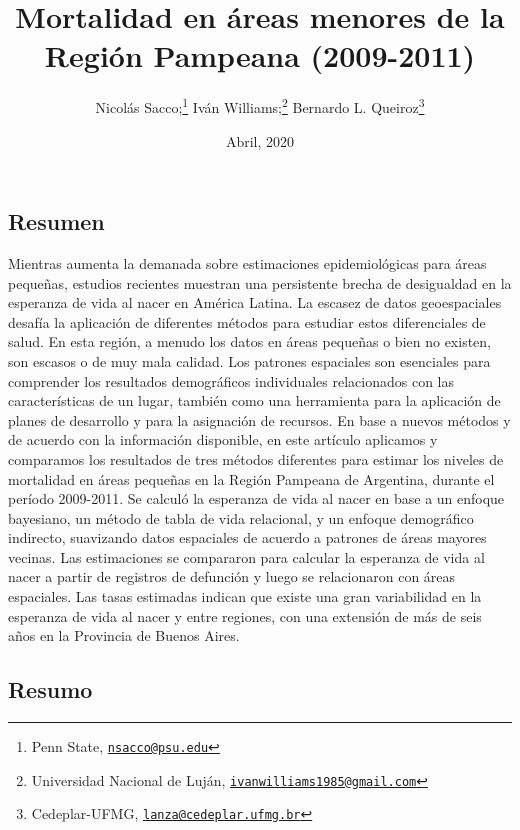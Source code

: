 \documentclass[12pt,]{article}
\title{Mortalidad en áreas menores de la Región Pampeana (2009-2011)}
\author{Nicolás Sacco;\footnote{Penn State,
  \href{mailto:nsacco@psu.edu}{\nolinkurl{nsacco@psu.edu}}} Iván
Williams;\footnote{Universidad Nacional de Luján,
  \href{mailto:ivanwilliams1985@gmail.com}{\nolinkurl{ivanwilliams1985@gmail.com}}}
Bernardo L. Queiroz\footnote{Cedeplar-UFMG,
  \href{mailto:lanza@cedeplar.ufmg.br}{\nolinkurl{lanza@cedeplar.ufmg.br}}}}
\date{Abril, 2020}
\begin{document}
\maketitle

\hypertarget{resumen}{%
\subsection{Resumen}\label{resumen}}

Mientras aumenta la demanada sobre estimaciones epidemiológicas para
áreas pequeñas, estudios recientes muestran una persistente brecha de
desigualdad en la esperanza de vida al nacer en América Latina. La
escasez de datos geoespaciales desafía la aplicación de diferentes
métodos para estudiar estos diferenciales de salud. En esta región, a
menudo los datos en áreas pequeñas o bien no existen, son escasos o de
muy mala calidad. Los patrones espaciales son esenciales para comprender
los resultados demográficos individuales relacionados con las
características de un lugar, también como una herramienta para la
aplicación de planes de desarrollo y para la asignación de recursos. En
base a nuevos métodos y de acuerdo con la información disponible, en
este artículo aplicamos y comparamos los resultados de tres métodos
diferentes para estimar los niveles de mortalidad en áreas pequeñas en
la Región Pampeana de Argentina, durante el período 2009-2011. Se
calculó la esperanza de vida al nacer en base a un enfoque bayesiano, un
método de tabla de vida relacional, y un enfoque demográfico indirecto,
suavizando datos espaciales de acuerdo a patrones de áreas mayores
vecinas. Las estimaciones se compararon para calcular la esperanza de
vida al nacer a partir de registros de defunción y luego se relacionaron
con áreas espaciales. Las tasas estimadas indican que existe una gran
variabilidad en la esperanza de vida al nacer y entre regiones, con una
extensión de más de seis años en la Provincia de Buenos Aires.

\hypertarget{resumo}{%
\subsection{Resumo}\label{resumo}}
\end{document}
